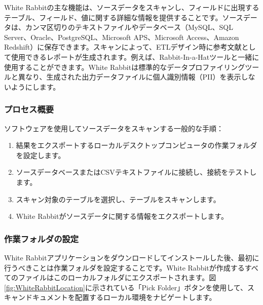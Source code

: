 \documentclass[
  11pt]{book}
\providecommand{\tightlist}{%
  \setlength{\itemsep}{0pt}\setlength{\parskip}{0pt}}
\theoremstyle{definition}
\theoremstyle{definition}
\theoremstyle{definition}
\theoremstyle{definition}
\theoremstyle{remark}
\begin{document}
White Rabbitの主な機能は、ソースデータをスキャンし、フィールドに出現するテーブル、フィールド、値に関する詳細な情報を提供することです。ソースデータは、カンマ区切りのテキストファイルやデータベース（MySQL、SQL Server、Oracle、PostgreSQL、Microsoft APS、Microsoft Access、Amazon Redshift）に保存できます。スキャンによって、ETLデザイン時に参考文献として使用できるレポートが生成されます。例えば、Rabbit-In-a-Hatツールと一緒に使用することができます。White Rabbitは標準的なデータプロファイリングツールと異なり、生成された出力データファイルに個人識別情報（PII）を表示しないようにします。

\subsubsection*{プロセス概要}\label{ux30d7ux30edux30bbux30b9ux6982ux8981}

ソフトウェアを使用してソースデータをスキャンする一般的な手順：

\begin{enumerate}
\def\labelenumi{\arabic{enumi}.}
\tightlist
\item
  結果をエクスポートするローカルデスクトップコンピュータの作業フォルダを設定します。
\item
  ソースデータベースまたはCSVテキストファイルに接続し、接続をテストします。
\item
  スキャン対象のテーブルを選択し、テーブルをスキャンします。
\item
  White Rabbitがソースデータに関する情報をエクスポートします。
\end{enumerate}

\subsubsection*{作業フォルダの設定}\label{ux4f5cux696dux30d5ux30a9ux30ebux30c0ux306eux8a2dux5b9a}

White Rabbitアプリケーションをダウンロードしてインストールした後、最初に行うべきことは作業フォルダを設定することです。White Rabbitが作成するすべてのファイルはこのローカルフォルダにエクスポートされます。図\ref{fig:WhiteRabbitLocation}に示されている「Pick Folder」ボタンを使用して、スキャンドキュメントを配置するローカル環境をナビゲートします。
\end{document}
